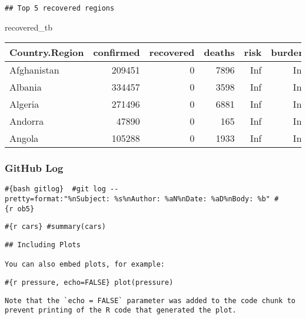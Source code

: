 \documentclass[
]{article}
\newenvironment{Shaded}{\begin{snugshade}}{\end{snugshade}}
\newcommand{\NormalTok}[1]{#1}
\begin{document}
\begin{verbatim}
## Top 5 recovered regions
\end{verbatim}

\begin{Shaded}
\begin{Highlighting}[]
\NormalTok{recovered\_tb}
\end{Highlighting}
\end{Shaded}

\begin{tabular}{l|r|r|r|r|r}
\hline
Country.Region & confirmed & recovered & deaths & risk & burden\\
\hline
Afghanistan & 209451 & 0 & 7896 & Inf & Inf\\
\hline
Albania & 334457 & 0 & 3598 & Inf & Inf\\
\hline
Algeria & 271496 & 0 & 6881 & Inf & Inf\\
\hline
Andorra & 47890 & 0 & 165 & Inf & Inf\\
\hline
Angola & 105288 & 0 & 1933 & Inf & Inf\\
\hline
\end{tabular}

\hypertarget{github-log}{%
\subsubsection{GitHub Log}\label{github-log}}

\texttt{\#\{bash\ gitlog\}\ \ \#git\ log\ -\/-pretty=format:"\%nSubject:\ \%s\%nAuthor:\ \%aN\%nDate:\ \%aD\%nBody:\ \%b"\ \#\{r\ ob5\}}

\texttt{\#\{r\ cars\}\ \#summary(cars)}

\begin{verbatim}
## Including Plots

You can also embed plots, for example:
\end{verbatim}

\texttt{\#\{r\ pressure,\ echo=FALSE\}\ plot(pressure)}

\begin{verbatim}
Note that the `echo = FALSE` parameter was added to the code chunk to prevent printing of the R code that generated the plot.
\end{verbatim}
\end{document}
